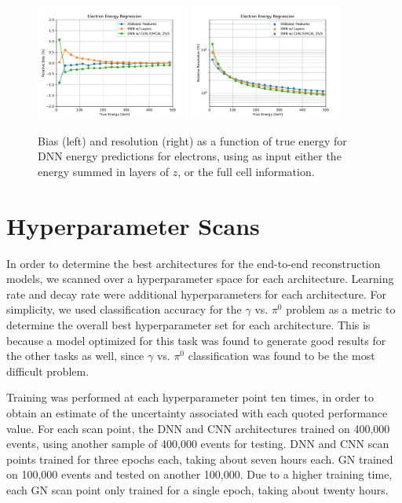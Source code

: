 \begin{figure}[htbp]
\centering
\includegraphics[width=0.45\textwidth]{Images/Calo/bias_vs_E_EleFixed_nn_inputs_zoom.pdf}
\includegraphics[width=0.45\textwidth]{Images/Calo/res_vs_E_EleFixed_nn_inputs_fits.pdf}
\caption{Bias (left) and resolution (right) as a function of true energy for DNN energy predictions for electrons, using as input either the energy summed in layers of $z$, or the full cell information.\label{fig:reg_dnn_inputs}}
\end{figure}

\section{Hyperparameter Scans}\label{sec:hpscan}

In order to determine the best architectures for the end-to-end reconstruction models, we scanned over a hyperparameter space for each architecture. Learning rate and decay rate were additional hyperparameters for each architecture. For simplicity, we used classification accuracy for the $\gamma$ vs. $\pi^0$ problem as a metric to determine the overall best hyperparameter set for each architecture. This is because a model optimized for this task was found to generate good results for the other tasks as well, since $\gamma$ vs. $\pi^0$ classification was found to be the most difficult problem.

Training was performed at each hyperparameter point ten times, in order to obtain an estimate of the uncertainty associated with each quoted performance value. For each scan point, the DNN and CNN architectures trained on 400,000 events, using another sample of 400,000 events for testing. DNN and CNN scan points trained for three epochs each, taking about seven hours each. GN trained on 100,000 events and tested on another 100,000. Due to a higher training time, each GN scan point only trained for a single epoch, taking about twenty hours.

